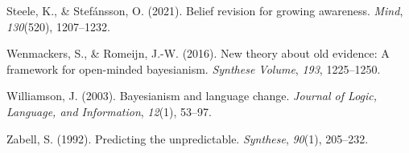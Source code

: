 \documentclass[
  11pt,
  dvipsnames,enabledeprecatedfontcommands]{scrartcl}
\newlength{\cslhangindent}
\newlength{\cslentryspacingunit} %
\newenvironment{CSLReferences}[2] %
 {%
  \setlength{\parindent}{0pt}
  \ifodd #1
  \let\oldpar\par
  \def\par{\hangindent=\cslhangindent\oldpar}
  \fi
  \setlength{\parskip}{#2\cslentryspacingunit}
 }%
 {}
\begin{document}
\begin{CSLReferences}{1}{0}
\leavevmode{}%
Steele, K., \& Stefánsson, O. (2021). Belief revision for growing
awareness. \emph{Mind}, \emph{130}(520), 1207--1232.

\leavevmode{}%
Wenmackers, S., \& Romeijn, J.-W. (2016). New theory about old evidence:
A framework for open-minded bayesianism. \emph{Synthese Volume},
\emph{193}, 1225--1250.

\leavevmode{}%
Williamson, J. (2003). Bayesianism and language change. \emph{Journal of
Logic, Language, and Information}, \emph{12}(1), 53--97.

\leavevmode{}%
Zabell, S. (1992). Predicting the unpredictable. \emph{Synthese},
\emph{90}(1), 205--232.

\end{CSLReferences}
\end{document}
